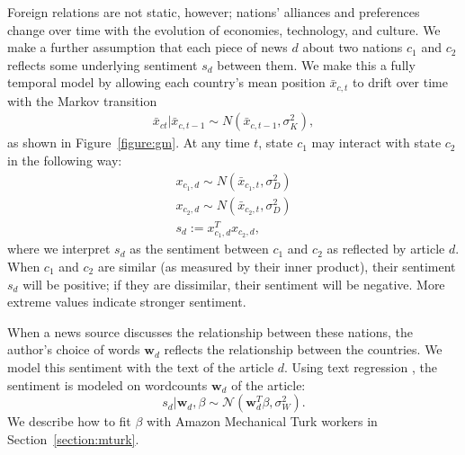 Foreign relations are not static, however; nations' alliances and
preferences change over time with the evolution of economies,
technology, and culture.  We make a further assumption that each piece
of news $d$ about two nations $c_1$ and $c_2$ reflects some underlying
sentiment $s_d$ between them.  We make this a fully temporal model by
allowing each country's mean position $\bar x_{c,t}$ to drift over
time with the Markov transition
\begin{align}
  \bar x_{ct} | \bar x_{c,t-1} \sim N(\bar x_{c,t-1}, \sigma_K^2),
\end{align}
as shown in Figure~\ref{figure:gm}. At any time $t$, state $c_1$ may interact with state $c_2$ in the following way:
\begin{align}
  x_{c_1,d} \sim N(\bar x_{c_1, t}, \sigma_D^2) \nonumber \\
  x_{c_2,d} \sim N(\bar x_{c_2, t}, \sigma_D^2) \nonumber \\
  s_d := x_{c_1,d}^T x_{c_2,d},
\label{equation:sentiment}
\end{align}
where we interpret $s_d$ as the sentiment between $c_1$ and $c_2$ as
reflected by article $d$.  When $c_1$ and $c_2$ are similar (as
measured by their inner product), their sentiment $s_d$ will be
positive; if they are dissimilar, their sentiment will be negative.
More extreme values indicate stronger sentiment.

\label{section:text_regression}
When a news source discusses the relationship between these nations,
the author's choice of words $\bm w_d$ reflects the relationship
between the countries.  We model this sentiment with the text of the
article $d$.  Using text regression \cite{kogan:2009}, the sentiment is modeled on wordcounts $\bm w_d$ of the article:
\[
  s_d | \bm w_d, \beta \sim \mathcal{N}( \bm w_d^T \beta , \sigma_W^2 ).
\]
We describe how to fit $\beta$ with Amazon Mechanical Turk workers in
Section~\ref{section:mturk}.



